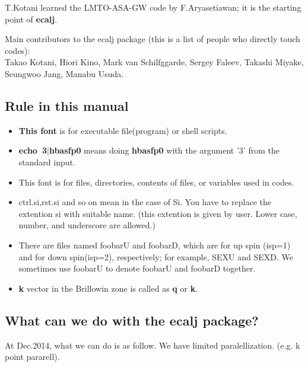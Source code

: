 \documentclass[a4paper,10pt,epsf,fleqn]{article}
\newcommand{\exe}[1]{{\bf #1}}
\newcommand{\io}[1]{{\sf  #1}}
\begin{document}
\noindent T.Kotani learned the LMTO-ASA-GW code by {F.Aryasetiawan};
it is the starting point of \exe{ecalj}.

\noindent Main contributors to the ecalj package
(this is a list of people who directly touch codes): \\
Takao Kotani, Hiori Kino, Mark van Schilfggarde, 
Sergey Faleev, Takashi Miyake, \\Seungwoo Jang, Manabu Usuda.

\newpage
\subsection{Rule in this manual} 
\begin{screen}
\begin{itemize}
\item
\exe{This font} is for executable file(program) or shell scripts.
\item
\exe{echo~3$|$hbasfp0 } means doing \exe{hbasfp0} 
with the argument '3' from the standard input.
\item
\io{This font} is for files, 
directories, contents of files, or variables used in codes.
\item
\io{ctrl.si},\io{rst.si} and so on mean in the case of Si. 
You have to replace the extention \io{si} with suitable name.
(this extention is given by user. Lower case, number, and underscore \io{[a-z0-9\_]} are allowed.)
\item
 There are files named \io{foobarU} and \io{foobarD}, which are
 for up spin (isp=1) and for down spin(isp=2), respectively; 
 for example, \io{SEXU} and \io{SEXD}.
 We sometimes use \io{foobarU} to denote \io{foobarU} and \io{foobarD}
     together.
\item
 {\bf k} vector in the Brillowin zone is called as {\bf q} or {\bf k}.
\end{itemize}
\vspace{-5mm}
\end{screen}


\subsection{What can we do with the \io{ecalj} package?}

At Dec.2014, what we can do is as follow. We have limited paralellization.
(e.g. k point pararell).
\end{document}
